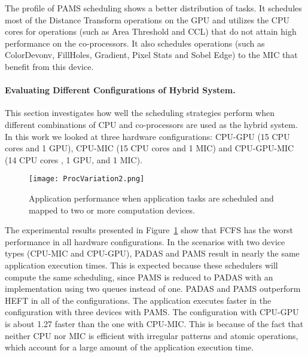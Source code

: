 The profile of PAMS scheduling shows a better distribution of tasks. It 
schedules most of the Distance Transform operations on the GPU and 
utilizes the CPU cores for operations (such as Area Threshold and CCL) 
that do not attain high performance on the co-processors. It also schedules 
operations (such as ColorDevonv, FillHoles, Gradient, Pixel Stats and Sobel 
Edge) to the MIC that benefit from this device.
\paragraph{{\bf Evaluating Different Configurations of Hybrid System.}}
This section investigates how well the scheduling strategies perform when 
different combinations of CPU and co-processors are used as the hybrid 
system. In this work we looked at three hardware configurations: CPU-GPU 
(15 CPU cores and 1 GPU), CPU-MIC (15 CPU cores and 1 MIC) and CPU-GPU-MIC 
(14 CPU cores , 1 GPU, and 1 MIC). 
\begin{figure}[htb!]
	\centering
	\texttt{[image: ProcVariation2.png]}
	\vspace{-2mm}
	\caption{Application performance when application tasks are scheduled and 
	mapped to two or more computation devices.}
	\label{fig:procVariation}
	\vspace{-1mm}
\end{figure}

The experimental results presented in Figure~\ref{fig:procVariation} show
that FCFS has the worst performance in all hardware configurations. In the
scenarios with two device types (CPU-MIC and CPU-GPU), PADAS and PAMS
result in nearly the same application execution times. This is expected because these
schedulers will compute the same scheduling, since PAMS is reduced to PADAS
with an implementation using two queues instead of one. PADAS and PAMS
outperform HEFT in all of the configurations. The application executes faster in 
the configuration with three devices with PAMS. 
The configuration
with CPU-GPU is about 1.27 faster than the one with CPU-MIC. 
This is because of the fact that neither CPU nor MIC is efficient with
irregular patterns and atomic operations, which account for a large amount
of the application execution time. 
